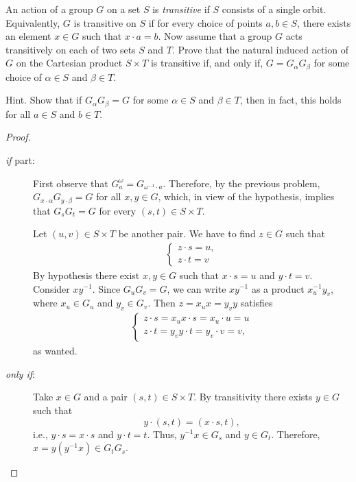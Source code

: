 \begin{probl}
    An action of a group\/ $G$ on a set\/ $S$ is \textsl{transitive} if\/ $S$ consists of a single orbit. Equivalently, $G$ is transitive on\/ $S$ if for every choice of points $a,b \in S$, there exists an element $x \in G$ such that $x \cdot a = b$. Now assume that a group\/ $G$ acts transitively on each of two sets $S$ and\/ $T$. Prove that the natural induced action of\/ $G$ on the Cartesian product $S \times T$ is transitive if, and only if, $G=G_\alpha G_\beta$ for some choice of\/ $\alpha \in S$ and\/ $\beta \in T$.
    
    \textrm{\rm Hint. Show that if $G_\alpha G_\beta=G$ for some $\alpha \in S$ and $\beta \in T$, then in fact, this holds for all $a \in S$ and $b \in T$.}
\end{probl}
    
\begin{proof} 
\begin{description}
    
\item[\rm\textit{if\/ } part:] First observe that $G_a^\omega=G_{\omega^{-1}\cdot a}$. Therefore, by the previous problem, $G_{x\cdot\alpha}G_{y\cdot\beta}=G$ for all $x,y\in G$, which, in view of the hypothesis, implies that $G_sG_t=G$ for every $(s,t)\in S\times T$.

Let $(u,v)\in S\times T$ be another pair. We have to find $z\in G$ such that
\begin{align*}
    \begin{cases}
        z\cdot s=u,\\
        z\cdot t=v
    \end{cases}
\end{align*}
By hypothesis there exist $x,y\in G$ such that $x\cdot s=u$ and $y\cdot t=v$. Consider $xy^{-1}$. Since $G_uG_v=G$, we can write $xy^{-1}$ as a product $x_u^{-1}y_v$, where $x_u\in G_u$ and $y_v\in G_v$. Then $z=x_ux=y_vy$ satisfies
\begin{align*}
    \begin{cases}
        z\cdot s = x_ux\cdot s=x_u\cdot u=u\\
        z\cdot t = y_vy\cdot t= y_v\cdot v=v,        
    \end{cases}
\end{align*}
as wanted.

\item[\rm\textit{only if\/}:] Take $x\in G$ and a pair $(s,t)\in S\times T$. By transitivity there exists $y\in G$ such that
$$
    y\cdot(s,t)=(x\cdot s,t),
$$
i.e., $y\cdot s=x\cdot s$ and $y\cdot t=t$. Thus, $y^{-1}x\in G_s$ and\/ $y\in G_t$. Therefore, $x=y(y^{-1}x)\in G_tG_s$.  \end{description}
\end{proof}

